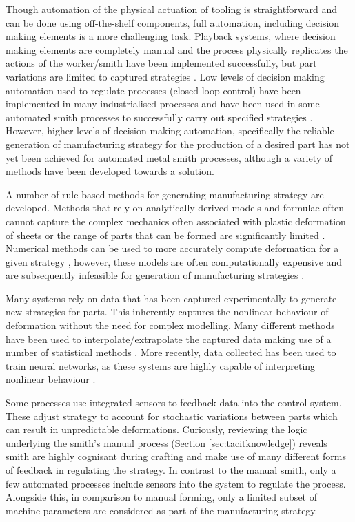 Though automation of the physical actuation of tooling is straightforward and can be done using off-the-shelf components, full automation, including decision making elements is a more challenging task. Playback systems, where decision making elements are completely manual and the process physically replicates the actions of the worker/smith have been implemented successfully, but part variations are limited to captured strategies \citep{Lloyd1986AnProspective,Hoffman2009AnHandling}. Low levels of decision making automation used to regulate processes (closed loop control) have been implemented in many industrialised processes \citep{Allwood2016Closed-loopForming} and have been used in some automated smith processes to successfully carry out specified strategies \citep{Rossi2018ModellingWheel,Arai2003RoboticControl}. However, higher levels of decision making automation, specifically the reliable generation of manufacturing strategy for the production of a desired part has not yet been achieved for automated metal smith processes, although a variety of methods have been developed towards a solution.

A number of rule based methods for generating manufacturing strategy are developed. Methods that rely on analytically derived models and formulae often cannot capture the complex mechanics often associated with plastic deformation of sheets  \citep{Yang2011GeometricalProcess} or the range of parts that can be formed are significantly limited \citep{Nzahumunyurwa2001OptimizationProcess}. Numerical methods can be used to more accurately compute deformation for a given strategy \citep{Bowen2021NumericalProcess}, however, these models are often computationally expensive and are subsequently infeasible for generation of manufacturing strategies \citep{Scherer2013MethodenBlechumformung,Polyblank2015TheSpinning}.

Many systems rely on data that has been captured experimentally to generate new strategies for parts. This inherently captures the nonlinear behaviour of deformation without the need for complex modelling. Many different methods have been used to interpolate/extrapolate the captured data making use of a number of statistical methods \citep{Hartmann2019Knowledge-basedPartitioning}. More recently, data collected has been used to train neural networks, as these systems are highly capable of interpreting nonlinear behaviour \citep{Rossi2018ModellingWheel,Hartmann2019AnFree-forming}.

Some processes use integrated sensors to feedback data into the control system. These adjust strategy to account for stochastic variations between parts which can result in unpredictable deformations. Curiously, reviewing the logic underlying the smith's manual process (Section \ref{sec:tacitknowledge}) reveals smith are highly cognisant during crafting and make use of many different forms of feedback in regulating the strategy. In contrast to the manual smith, only a few automated processes include sensors into the system to regulate the process. Alongside this, in comparison to manual forming, only a limited subset of machine parameters are considered as part of the manufacturing strategy.

